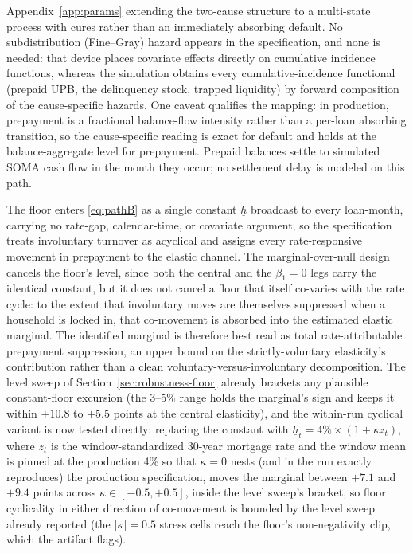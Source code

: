 \documentclass[12pt]{article}
\begin{document}
Appendix~\ref{app:params} extending the two-cause structure to a multi-state process with cures rather than an immediately absorbing default. No subdistribution (Fine--Gray) hazard \citep{fine1999} appears in the specification, and none is needed: that device places covariate effects directly on cumulative incidence functions, whereas the simulation obtains every cumulative-incidence functional (prepaid UPB, the delinquency stock, trapped liquidity) by forward composition of the cause-specific hazards. One caveat qualifies the mapping: in production, prepayment is a fractional balance-flow intensity rather than a per-loan absorbing transition, so the cause-specific reading is exact for default and holds at the balance-aggregate level for prepayment. Prepaid balances settle to simulated SOMA cash flow in the month they occur; no settlement delay is modeled on this path.

The floor enters \eqref{eq:pathB} as a single constant $\underline{h}$ broadcast to every loan-month, carrying no rate-gap, calendar-time, or covariate argument, so the specification treats involuntary turnover as acyclical and assigns every rate-responsive movement in prepayment to the elastic channel. The marginal-over-null design cancels the floor's level, since both the central and the $\beta_1 = 0$ legs carry the identical constant, but it does not cancel a floor that itself co-varies with the rate cycle: to the extent that involuntary moves are themselves suppressed when a household is locked in, that co-movement is absorbed into the estimated elastic marginal. The identified marginal is therefore best read as total rate-attributable prepayment suppression, an upper bound on the strictly-voluntary elasticity's contribution rather than a clean voluntary-versus-involuntary decomposition. The level sweep of Section~\ref{sec:robustness-floor} already brackets any plausible constant-floor excursion (the 3--5\% range holds the marginal's sign and keeps it within $+10.8$ to $+5.5$ points at the central elasticity), and the within-run cyclical variant is now tested directly: replacing the constant with $\underline{h}_t = 4\% \times (1 + \kappa z_t)$, where $z_t$ is the window-standardized 30-year mortgage rate and the window mean is pinned at the production 4\% so that $\kappa = 0$ nests (and in the run exactly reproduces) the production specification, moves the marginal between $+7.1$ and $+9.4$ points across $\kappa \in [-0.5, +0.5]$, inside the level sweep's bracket, so floor cyclicality in either direction of co-movement is bounded by the level sweep already reported (the $|\kappa| = 0.5$ stress cells reach the floor's non-negativity clip, which the artifact flags).
\end{document}
